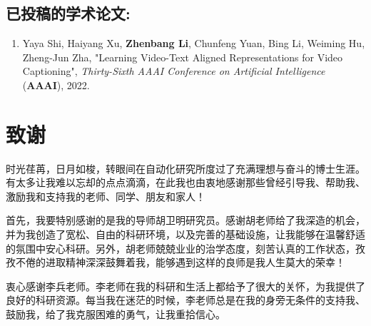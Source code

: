 \section*{已投稿的学术论文:}

{
\setlist[enumerate]{}%
\begin{enumerate}[nosep]
    \item Yaya Shi, Haiyang Xu, \textbf{Zhenbang Li}, Chunfeng Yuan, Bing Li, Weiming Hu, Zheng-Jun Zha, "Learning Video-Text Aligned Representations for Video Captioning", \textit{Thirty-Sixth AAAI Conference on Artificial Intelligence} (\textbf{AAAI}), 2022.
\end{enumerate}
}
\iffalse
\section*{申请或已获得的专利:}

(无专利时此项不必列出)

\section*{参加的研究项目及获奖情况:}

可以随意添加新的条目或是结构。
\fi
\chapter[致谢]{致\quad 谢}%
\thispagestyle{noheaderstyle}%

时光荏苒，日月如梭，转眼间在自动化研究所度过了充满理想与奋斗的博士生涯。有太多让我难以忘却的点点滴滴，在此我也由衷地感谢那些曾经引导我、帮助我、激励我和支持我的老师、同学、朋友和家人！

首先，我要特别感谢的是我的导师胡卫明研究员。感谢胡老师给了我深造的机会，并为我创造了宽松、自由的科研环境，以及完善的基础设施，让我能够在温馨舒适的氛围中安心科研。另外，胡老师兢兢业业的治学态度，刻苦认真的工作状态，孜孜不倦的进取精神深深鼓舞着我，能够遇到这样的良师是我人生莫大的荣幸！

衷心感谢李兵老师。李老师在我的科研和生活上都给予了很大的关怀，为我提供了良好的科研资源。每当我在迷茫的时候，李老师总是在我的身旁无条件的支持我、鼓励我，给了我克服困难的勇气，让我重拾信心。

